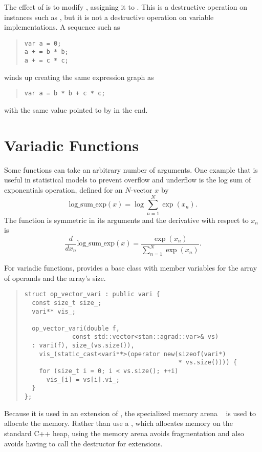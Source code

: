 \documentclass[10pt]{article}
\begin{document}
The effect of  is to modify , assigning it to
.  This is a destructive operation on  instances
such as , but it is not a destructive operation on variable
implementations.  A sequence such as 
%
\begin{quote}
\begin{Verbatim}
var a = 0;
a + = b * b;
a + = c * c;
\end{Verbatim}
\end{quote}
%
winds up creating the same expression graph as
%
\begin{quote}
\begin{Verbatim}
var a = b * b + c * c;
\end{Verbatim}
\end{quote}
%
with the same value pointed to by  in the end.


\section{Variadic Functions}\label{variadic-functions.section}

Some functions can take an arbitrary number of arguments.  One example
that is useful in statistical models to prevent overflow and underflow
is the log sum of exponentials operation, defined for an $N$-vector
$x$ by
%
\[
\mbox{log\_sum\_exp}(x) 
= \log \sum_{n=1}^N \exp(x_n).
\]
%
The function is symmetric in its arguments and the derivative with
respect to $x_n$ is
\[
\frac{d}{d x_n} \mbox{log\_sum\_exp}(x)
= \frac{\exp(x_n)}{\sum_{n=1}^N \exp(x_n)}.
\]

For variadic functions,  provides a base class
with member variables for the array of operands and the array's size.
%
\begin{quote}
\begin{Verbatim}
struct op_vector_vari : public vari {
  const size_t size_;
  vari** vis_;

  op_vector_vari(double f, 
             const std::vector<stan::agrad::var>& vs) 
  : vari(f), size_(vs.size()), 
    vis_(static_cast<vari**>(operator new(sizeof(vari*) 
                                          * vs.size()))) {
    for (size_t i = 0; i < vs.size(); ++i)
      vis_[i] = vs[i].vi_;
  }
};
\end{Verbatim}
\end{quote}
%
Because it is used in an extension of , the specialized
memory arena ~ is used to allocate the
memory.  Rather than use a , which allocates memory
on the standard C++ heap, using the memory arena avoids fragmentation
and also avoids having to call the destructor for  extensions.
\end{document}
